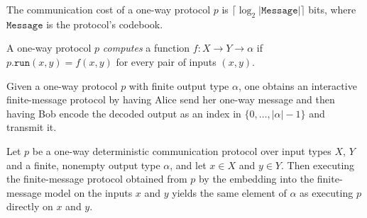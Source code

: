 \begin{definition}
\label{CommunicationComplexity.Deterministic.OneWay.Protocol.cost}
\leanok
{}
The communication cost of a one-way protocol $p$ is $\lceil \log_2 |\mathtt{Message}| \rceil$
bits, where $\mathtt{Message}$ is the protocol's codebook.
\end{definition}

\begin{definition}
\label{CommunicationComplexity.Deterministic.OneWay.Protocol.Computes}
\leanok
{}
A one-way protocol $p$ \emph{computes} a function $f : X \to Y \to \alpha$ if
$p.\mathtt{run}(x, y) = f(x, y)$ for every pair of inputs $(x, y)$.
\end{definition}

\begin{definition}
\label{CommunicationComplexity.Deterministic.OneWay.Protocol.toFiniteMessage}
\leanok
{}
Given a one-way protocol $p$ with finite output type $\alpha$, one obtains an interactive
finite-message protocol by having Alice send her one-way message and then having Bob
encode the decoded output as an index in $\{0,\ldots,|\alpha|-1\}$ and transmit it.
\end{definition}

\begin{theorem}
\label{CommunicationComplexity.Deterministic.OneWay.Protocol.toFiniteMessage_run}
\leanok
{}
Let $p$ be a one-way deterministic communication protocol over input types $X$, $Y$ and
a finite, nonempty output type $\alpha$, and let $x \in X$ and $y \in Y$. Then executing
the finite-message protocol obtained from $p$ by the embedding into the finite-message
model on the inputs $x$ and $y$ yields the same element of $\alpha$ as executing $p$
directly on $x$ and $y$.
\end{theorem}

